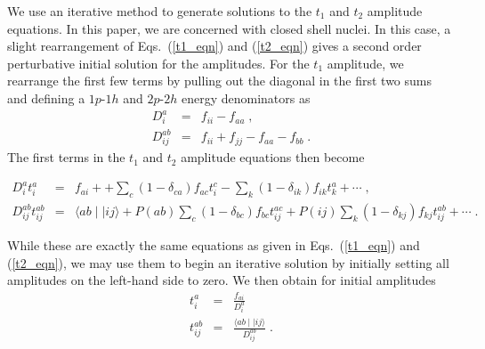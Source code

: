 \documentclass[aps,prc,twocolumn,floatfix]{revtex4}
\begin{document}
We use an iterative method to generate 
solutions to the $t_1$ and $t_2$ amplitude equations. In this paper,
we are concerned with closed shell nuclei. In this case, a slight 
rearrangement of Eqs.~(\ref{t1_eqn}) and (\ref{t2_eqn}) gives a second
order perturbative initial solution for the amplitudes. For the 
$t_1$ amplitude, we rearrange the first few terms by pulling out the
diagonal in the first two sums and defining a $1p$-$1h$ and $2p$-$2h$ 
energy denominators as
\begin{eqnarray}
D^a_i & = & f_{ii}-f_{aa} \;, \\
D^{ab}_{ij} & = & f_{ii}+f_{jj}-f_{aa}-f_{bb} \;.
\end{eqnarray}
The first terms in the $t_1$ and $t_2$ amplitude equations then become
\begin{widetext}
\begin{eqnarray}
D^a_i t^a_i & = & f_{ai} + 
+ \sum_c (1-\delta_{ca})f_{ac}t^c_i - \sum_k (1-\delta_{ik})f_{ik}t^a_k 
+\cdots \;, \\
D^{ab}_{ij}t^{ab}_{ij} & = & \langle ab\mid\mid ij \rangle +
P(ab)\sum_c(1-\delta_{bc})f_{bc}t^{ac}_{ij}+
P(ij)\sum_k(1-\delta_{kj}) f_{kj}t^{ab}_{ij}+\cdots\;.
\end{eqnarray}
\end{widetext}
While these are exactly the same equations as given in 
Eqs.~(\ref{t1_eqn}) and (\ref{t2_eqn}),
we may use them to begin an iterative solution by 
initially setting all amplitudes on the left-hand side to zero. We
then obtain for initial amplitudes 
\begin{eqnarray}
t^a_i &=& \frac{f_{ai}}{D^a_i} \\
t^{ab}_{ij} &=& \frac{\langle ab \mid\mid ij \rangle}{D^{ab}_{ij}}\;. 
\label{amp_start}
\end{eqnarray}
\end{document}
